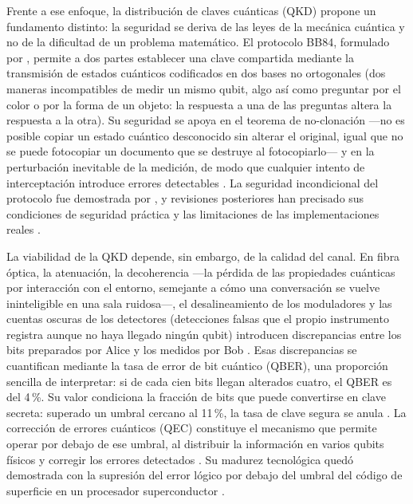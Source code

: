 \documentclass[12pt]{report}
\begin{document}
Frente a ese enfoque, la distribución de claves cuánticas (QKD) propone un
fundamento distinto: la seguridad se deriva de las leyes de la mecánica cuántica
y no de la dificultad de un problema matemático. El protocolo BB84, formulado por
\citet{bennett1984}, permite a dos partes establecer una clave compartida
mediante la transmisión de estados cuánticos codificados en dos bases no
ortogonales (dos maneras incompatibles de medir un mismo qubit, algo así como
preguntar por el color o por la forma de un objeto: la respuesta a una de las
preguntas altera la respuesta a la otra). Su seguridad se apoya en el teorema de
no-clonación —no es posible copiar un estado cuántico desconocido sin alterar el
original, igual que no se puede fotocopiar un documento que se destruye al
fotocopiarlo— y en la perturbación inevitable de la medición, de modo que
cualquier intento de interceptación introduce errores detectables
\citep{gisin2002}. La seguridad incondicional del protocolo fue demostrada por
\citet{shor2000}, y revisiones posteriores han precisado sus condiciones de
seguridad práctica y las limitaciones de las implementaciones reales
\citep{scarani2009, xu2020, pirandola2020, lo2014}.

La viabilidad de la QKD depende, sin embargo, de la calidad del canal. En fibra
óptica, la atenuación, la decoherencia —la pérdida de las propiedades cuánticas
por interacción con el entorno, semejante a cómo una conversación se vuelve
ininteligible en una sala ruidosa—, el desalineamiento de los moduladores y las
cuentas oscuras de los detectores (detecciones falsas que el propio instrumento
registra aunque no haya llegado ningún qubit) introducen discrepancias entre los
bits preparados por Alice y los medidos por Bob \citep{xu2020}. Esas discrepancias
se cuantifican mediante la tasa de error de bit cuántico (QBER), una proporción
sencilla de interpretar: si de cada cien bits llegan alterados cuatro, el QBER
es del 4\,\%. Su valor condiciona la fracción de bits que puede convertirse en
clave secreta: superado un umbral cercano al 11\,\%, la tasa de clave segura se
anula \citep{shor2000}. La corrección de errores cuánticos (QEC) constituye el
mecanismo que permite operar por debajo de ese umbral, al distribuir la
información en varios qubits físicos y corregir los errores detectados
\citep{nielsen2010, terhal2015}. Su madurez tecnológica quedó demostrada con la
supresión del error lógico por debajo del umbral del código de superficie en un
procesador superconductor \citep{google2025}.
\end{document}
